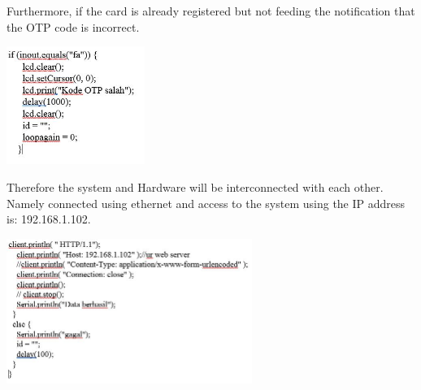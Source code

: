 Furthermore, if the card is already registered but not feeding the notification that the OTP code is incorrect.

\begin{left}
\includegraphics[width=4.5cm]{figures/COde4.JPG}
\end{left}

Therefore the system and Hardware will be interconnected with each other. Namely connected using ethernet and access to the system using the IP address is: 192.168.1.102.

\begin{left}
\includegraphics[width=8cm]{figures/COde5.JPG}
\end{left}